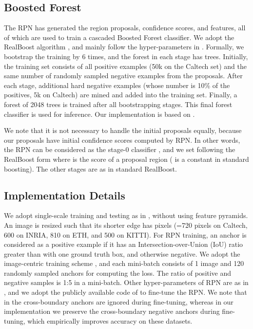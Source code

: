 \documentclass[runningheads]{llncs}
\begin{document}
\subsection{Boosted Forest}

The RPN has generated the region proposals, confidence scores, and features, all of which are used to train a cascaded Boosted Forest classifier. We adopt the RealBoost algorithm \cite{friedman2000additive}, and mainly follow the hyper-parameters in \cite{cai2015learning}.
Formally, we bootstrap the training by 6 times, and the forest in each stage has  trees. Initially, the training set consists of all positive examples (50k on the Caltech set) and the same number of randomly sampled negative examples from the proposals. After each stage, additional hard negative examples (whose number is 10\% of the positives, 5k on Caltech) are mined and added into the training set. Finally, a forest of 2048 trees is trained after all bootstrapping stages. This final forest classifier is used for inference. Our implementation is based on \cite{PMT}.

We note that it is not necessary to handle the initial proposals equally, because our proposals have initial confidence scores computed by RPN. In other words, the RPN can be considered as the stage-0 classifier , and we set  following the RealBoost form where  is the score of a proposal region ( is a constant in standard boosting). The other stages are as in standard RealBoost.

\subsection{Implementation Details}

We adopt single-scale training and testing as in \cite{he14ECCV,girshickICCV15fastrcnn,ren2015faster}, without using feature pyramids.
An image is resized such that its shorter edge has  pixels (=720 pixels on Caltech, 600 on INRIA, 810 on ETH, and 500 on KITTI).
For RPN training, an anchor is considered as a positive example if it has an Intersection-over-Union (IoU) ratio greater than  with one ground truth box, and otherwise negative. We adopt the image-centric training scheme \cite{girshickICCV15fastrcnn,ren2015faster}, and each mini-batch consists of 1 image and 120 randomly sampled anchors for computing the loss.  The ratio of positive and negative samples is 1:5 in a mini-batch. Other hyper-parameters of RPN are as in \cite{ren2015faster}, and we adopt the publicly available code of \cite{ren2015faster} to fine-tune the RPN. We note that in \cite{ren2015faster} the cross-boundary anchors are ignored during fine-tuning, whereas in our implementation we preserve the cross-boundary negative anchors during fine-tuning, which empirically improves accuracy on these datasets.
\end{document}
